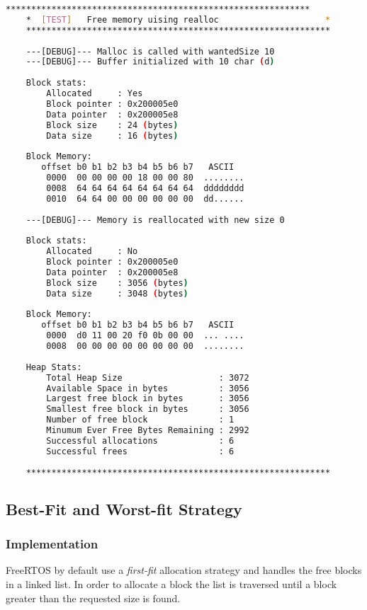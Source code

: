     \begin{outputbox}
    \begin{lstlisting}[language=bash]
    ************************************************************
    *  [TEST]   Free memory uising realloc                     *
    ************************************************************
        
    ---[DEBUG]--- Malloc is called with wantedSize 10
    ---[DEBUG]--- Buffer initialized with 10 char (d)
    
    Block stats:
        Allocated     : Yes
        Block pointer : 0x200005e0
        Data pointer  : 0x200005e8
        Block size    : 24 (bytes)
        Data size     : 16 (bytes)
    
    Block Memory:
       offset b0 b1 b2 b3 b4 b5 b6 b7   ASCII
        0000  00 00 00 00 18 00 00 80  ........
        0008  64 64 64 64 64 64 64 64  dddddddd
        0010  64 64 00 00 00 00 00 00  dd......
    
    ---[DEBUG]--- Memory is reallocated with new size 0
    
    Block stats:
        Allocated     : No
        Block pointer : 0x200005e0
        Data pointer  : 0x200005e8
        Block size    : 3056 (bytes)
        Data size     : 3048 (bytes)
    
    Block Memory:
       offset b0 b1 b2 b3 b4 b5 b6 b7   ASCII
        0000  d0 11 00 20 f0 0b 00 00  ... ....
        0008  00 00 00 00 00 00 00 00  ........
    
    Heap Stats:
        Total Heap Size                   : 3072
        Available Space in bytes          : 3056
        Largest free block in bytes       : 3056
        Smallest free block in bytes      : 3056
        Number of free block              : 1
        Minumum Ever Free Bytes Remaining : 2992
        Successful allocations            : 6
        Successful frees                  : 6
    
    ************************************************************
    \end{lstlisting}
    \end{outputbox}

\subsection{Best-Fit and Worst-fit Strategy}
    \subsubsection{Implementation}
    FreeRTOS by default use a \textit{first-fit} allocation strategy and handles the free blocks in a linked list. In order to allocate a block the list is traversed until a block greater than the requested size is found. 

